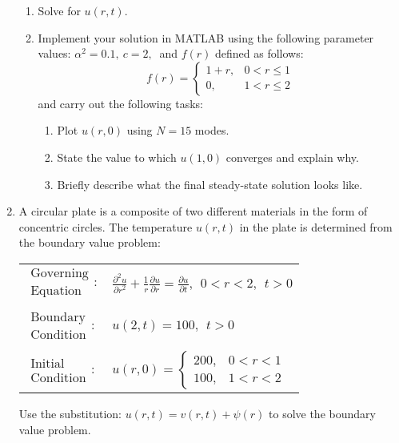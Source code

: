 \begin{fullwidth}
\begin{enumerate}
\begin{enumerate}
\item Solve for $u(r,t)$.


\item Implement your solution in MATLAB using the following parameter values: $\alpha^2 = 0.1, \ c=2, \ $ and $f(r)$ defined as follows:
\begin{equation*}
f(r) = 
\begin{cases}
1+r, & 0 < r \le 1 \\
0, & 1 < r \le 2
\end{cases}
\end{equation*}
and carry out the following tasks:
\begin{enumerate}
\item Plot $u(r,0)$ using $N=15$ modes.
\item State the value to which $u(1,0)$ converges and explain why.  
\item Briefly describe what the final steady-state solution looks like.
\end{enumerate}

\end{enumerate}

\vspace{2.0cm}

\item A circular plate is a composite of two different materials in the form of concentric circles.  The temperature $u(r,t)$ in the plate is determined from the boundary value problem:

\begin{table}[h!]
\begin{tabular}{l l}
$\substack{\text{Governing} \\\text{Equation}}: $& $\frac{\partial^2 u}{\partial r^2} + \frac{1}{r}\frac{\partial u}{\partial r} = \frac{\partial u}{\partial t}, \ \ 0<r<2, \ \ t>0$ \\
& \\
$\substack{\text{Boundary} \\ \text{Condition}}: $& $u(2,t)=100, \ \ t>0$\\
& \\
$\substack{\text{Initial} \\ \text{Condition}}: $ & $u(r,0) = \begin{cases} 200, & 0<r<1 \\ 100, & 1 < r < 2  \end{cases} $ \\
\end{tabular}
\end{table}
Use the substitution: $u(r,t) = v(r,t) + \psi(r)$ to solve the boundary value problem. 


\end{enumerate}

\end{fullwidth}

